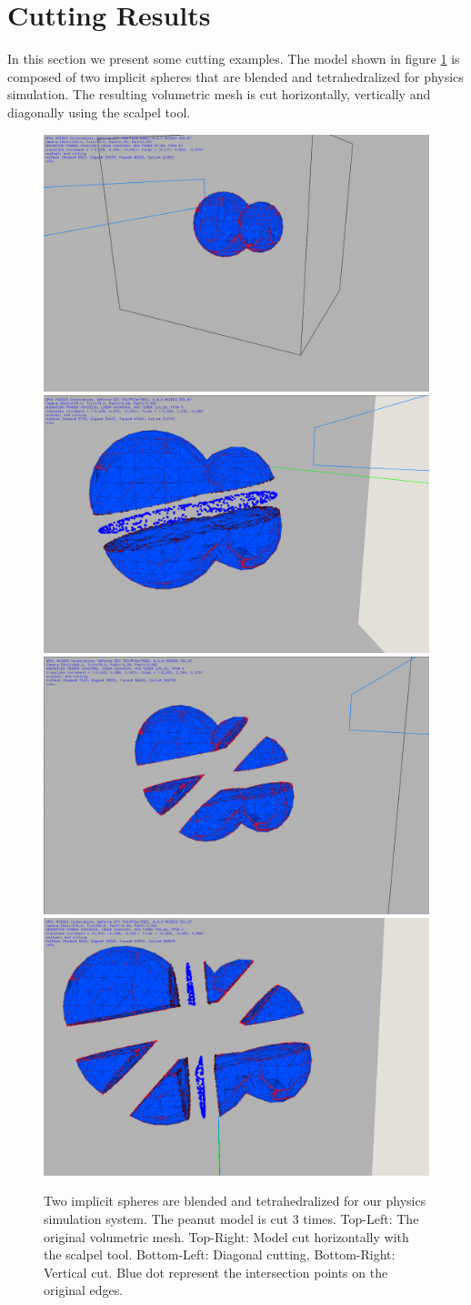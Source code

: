 \section{Cutting Results}
In this section we present some cutting examples. The model shown in figure \ref{fig:dumbelsexample} is composed of 
two implicit spheres that are blended and tetrahedralized for physics simulation. The resulting volumetric mesh is cut horizontally, vertically and
diagonally using the scalpel tool. 

\begin{figure}[H]
  \centering
  \includegraphics[width=0.4\linewidth]{figures/cutting/dumbel01.png}
  \includegraphics[width=0.4\linewidth]{figures/cutting/dumbel02.png}
  \includegraphics[width=0.4\linewidth]{figures/cutting/dumbel03.png}
  \includegraphics[width=0.4\linewidth]{figures/cutting/dumbel04.png}
  
  \caption{\label{fig:dumbelsexample}
  {Two implicit spheres are blended and tetrahedralized for our physics simulation system. The peanut model is cut 3 times.
  Top-Left: The original volumetric mesh. Top-Right: Model cut horizontally with the scalpel tool.
  Bottom-Left: Diagonal cutting, Bottom-Right: Vertical cut. Blue dot represent the intersection points on the original edges.}
}
\end{figure}

